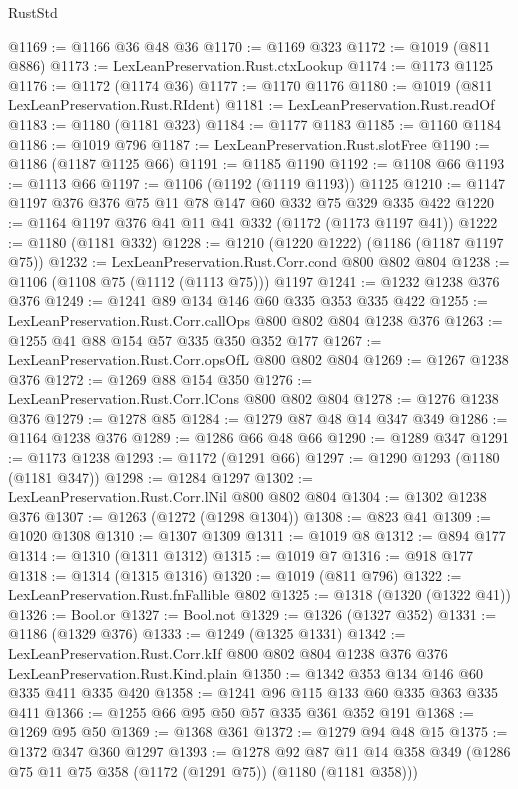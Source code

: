 \begin{lexlean}{RustStd}
\begin{coremodule}
@1169 := @1166 @36 @48 @36
@1170 := @1169 @323
@1172 := @1019 (@811 @886)
@1173 := LexLeanPreservation.Rust.ctxLookup
@1174 := @1173 @1125
@1176 := @1172 (@1174 @36)
@1177 := @1170 @1176
@1180 := @1019 (@811 LexLeanPreservation.Rust.RIdent)
@1181 := LexLeanPreservation.Rust.readOf
@1183 := @1180 (@1181 @323)
@1184 := @1177 @1183
@1185 := @1160 @1184
@1186 := @1019 @796
@1187 := LexLeanPreservation.Rust.slotFree
@1190 := @1186 (@1187 @1125 @66)
@1191 := @1185 @1190
@1192 := @1108 @66
@1193 := @1113 @66
@1197 := @1106 (@1192 (@1119 @1193)) @1125
@1210 := @1147 @1197 @376 @376 @75 @11 @78 @147 @60 @332 @75 @329 @335 @422
@1220 := @1164 @1197 @376 @41 @11 @41 @332 (@1172 (@1173 @1197 @41))
@1222 := @1180 (@1181 @332)
@1228 := @1210 (@1220 @1222) (@1186 (@1187 @1197 @75))
@1232 := LexLeanPreservation.Rust.Corr.cond @800 @802 @804
@1238 := @1106 (@1108 @75 (@1112 (@1113 @75))) @1197
@1241 := @1232 @1238 @376 @376
@1249 := @1241 @89 @134 @146 @60 @335 @353 @335 @422
@1255 := LexLeanPreservation.Rust.Corr.callOps @800 @802 @804 @1238 @376
@1263 := @1255 @41 @88 @154 @57 @335 @350 @352 @177
@1267 := LexLeanPreservation.Rust.Corr.opsOfL @800 @802 @804
@1269 := @1267 @1238 @376
@1272 := @1269 @88 @154 @350
@1276 := LexLeanPreservation.Rust.Corr.lCons @800 @802 @804
@1278 := @1276 @1238 @376
@1279 := @1278 @85
@1284 := @1279 @87 @48 @14 @347 @349
@1286 := @1164 @1238 @376
@1289 := @1286 @66 @48 @66
@1290 := @1289 @347
@1291 := @1173 @1238
@1293 := @1172 (@1291 @66)
@1297 := @1290 @1293 (@1180 (@1181 @347))
@1298 := @1284 @1297
@1302 := LexLeanPreservation.Rust.Corr.lNil @800 @802 @804
@1304 := @1302 @1238 @376
@1307 := @1263 (@1272 (@1298 @1304))
@1308 := @823 @41
@1309 := @1020 @1308
@1310 := @1307 @1309
@1311 := @1019 @8
@1312 := @894 @177
@1314 := @1310 (@1311 @1312)
@1315 := @1019 @7
@1316 := @918 @177
@1318 := @1314 (@1315 @1316)
@1320 := @1019 (@811 @796)
@1322 := LexLeanPreservation.Rust.fnFallible @802
@1325 := @1318 (@1320 (@1322 @41))
@1326 := Bool.or
@1327 := Bool.not
@1329 := @1326 (@1327 @352)
@1331 := @1186 (@1329 @376)
@1333 := @1249 (@1325 @1331)
@1342 := LexLeanPreservation.Rust.Corr.kIf
    @800
    @802
    @804
    @1238
    @376
    @376
    LexLeanPreservation.Rust.Kind.plain
@1350 := @1342 @353 @134 @146 @60 @335 @411 @335 @420
@1358 := @1241 @96 @115 @133 @60 @335 @363 @335 @411
@1366 := @1255 @66 @95 @50 @57 @335 @361 @352 @191
@1368 := @1269 @95 @50
@1369 := @1368 @361
@1372 := @1279 @94 @48 @15
@1375 := @1372 @347 @360 @1297
@1393 := @1278
    @92
    @87
    @11
    @14
    @358
    @349
    (@1286 @75 @11 @75 @358 (@1172 (@1291 @75)) (@1180 (@1181 @358)))

\end{coremodule}
\end{lexlean}
